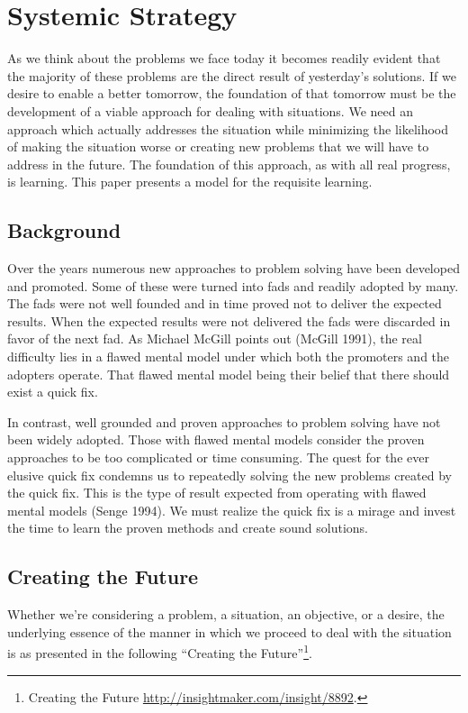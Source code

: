 \documentclass[]{memoir}
\begin{document}
\section{Systemic Strategy}

As we think about the problems we face today it becomes readily evident
that the majority of these problems are the direct result of yesterday's
solutions. If we desire to enable a better tomorrow, the foundation of
that tomorrow must be the development of a viable approach for dealing
with situations. We need an approach which actually addresses the
situation while minimizing the likelihood of making the situation worse
or creating new problems that we will have to address in the future. The
foundation of this approach, as with all real progress, is learning.
This paper presents a model for the requisite learning.

\subsection{Background}

Over the years numerous new approaches to problem solving have been
developed and promoted. Some of these were turned into fads and readily
adopted by many. The fads were not well founded and in time proved not
to deliver the expected results. When the expected results were not
delivered the fads were discarded in favor of the next fad. As Michael
McGill points out (McGill 1991), the real difficulty lies in a flawed
mental model under which both the promoters and the adopters operate.
That flawed mental model being their belief that there should exist a
quick fix.

In contrast, well grounded and proven approaches to problem solving have
not been widely adopted. Those with flawed mental models consider the
proven approaches to be too complicated or time consuming. The quest for
the ever elusive quick fix condemns us to repeatedly solving the new
problems created by the quick fix. This is the type of result expected
from operating with flawed mental models (Senge 1994). We must realize
the quick fix is a mirage and invest the time to learn the proven
methods and create sound solutions.

\subsection{Creating the Future}

Whether we're considering a problem, a situation, an objective, or a
desire, the underlying essence of the manner in which we proceed to deal
with the situation is as presented in the following ``Creating the
Future''\footnote{Creating the Future
  \url{http://insightmaker.com/insight/8892}.}.
\end{document}
